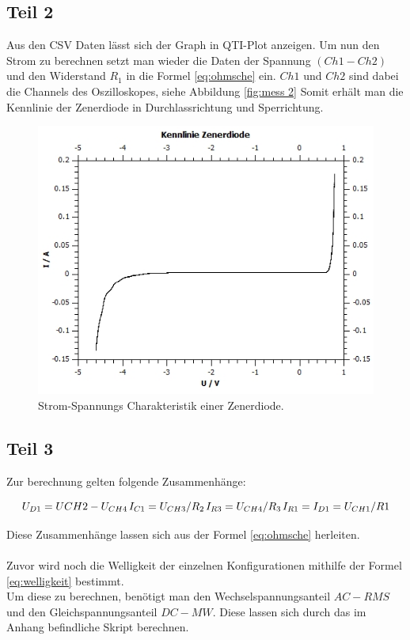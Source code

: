 \documentclass[12pt,a4paper,twoside]{article}
\begin{document}
\subsection{Teil 2}
Aus den CSV Daten lässt sich der Graph in QTI-Plot anzeigen. 
Um nun den Strom zu berechnen setzt man wieder die Daten der Spannung $(Ch1 - Ch2)$ und den Widerstand $R_1$ in die Formel \ref{eq:ohmsche} ein. 
$Ch1 $ und $ Ch2$ sind dabei die Channels des Oszilloskopes, siehe Abbildung \ref{fig:mess 2}
Somit erhält man die Kennlinie der Zenerdiode in Durchlassrichtung und Sperrichtung. 

\begin{figure}[H]
    \centering
    \includegraphics[width=0.6\linewidth]{nudes/2 plot.jpg}
    \caption{Strom-Spannungs Charakteristik einer Zenerdiode. }
    \label{fig:ausw 2}
\end{figure}

\subsection{Teil 3}
Zur berechnung gelten folgende Zusammenhänge: 

\begin{equation}
    \label{eq:zusammenhänge}
    \centerline{$U_{D1} = U{CH2} - U_{CH4} $ \\ $I_{C1} = U_{CH3}/R_2$ \\ $I_{R3} = U_{CH4}/R_3$ \\ $I_{R1} = I_{D1} = U_{CH1}/R1$}
\end{equation}

\noindent
Diese Zusammenhänge lassen sich aus der Formel \ref{eq:ohmsche} herleiten. 
\\
\\
Zuvor wird noch die Welligkeit der einzelnen Konfigurationen mithilfe der Formel \ref{eq:welligkeit} bestimmt. 
\\
Um diese zu berechnen, benötigt man den Wechselspannungsanteil $AC-RMS$ und den Gleichspannungsanteil $DC-MW$. Diese lassen sich durch das im Anhang befindliche Skript berechnen. 
\end{document}
